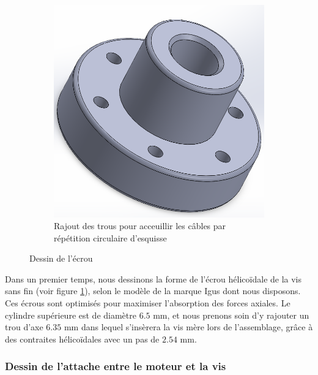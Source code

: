 \documentclass[a4paper, 11pt]{report}
\begin{document}
\begin{figure}
\begin{subfigure}[t]{0.3\textwidth}
                    \includegraphics[width=\textwidth]{Figures/ecrou_trou.png}
                    \caption{Rajout des trous pour acceuillir les câbles par répétition circulaire d'esquisse}
                \end{subfigure}
                \caption{Dessin de l'écrou}
                \label{fig:ecrou}
            \end{figure}

            Dans un premier temps, nous dessinons la forme de l'écrou hélicoïdale de la vis sans fin (voir figure \ref{fig:ecrou}), selon le modèle de la marque Igus dont nous disposons. Ces écrous sont optimisés pour maximiser l'absorption des forces axiales. \cite{noauthor_bague_nodate} Le cylindre supérieure est de diamètre $6.5$ mm, et nous prenons soin d'y rajouter un trou d'axe $6.35$ mm dans lequel s'insèrera la vis mère lors de l'assemblage, grâce à des contraites hélicoïdales avec un pas de $2.54$ mm. \cite{noauthor_bague_nodate}

        \subsubsection{Dessin de l'attache entre le moteur et la vis}
\end{document}
